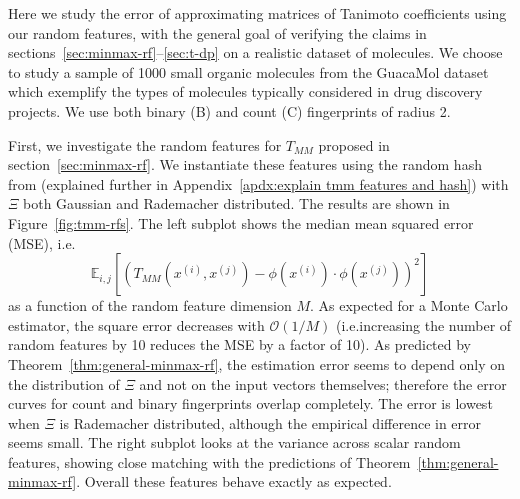 Here we study the error of approximating matrices of Tanimoto coefficients using our random features,
with the general goal of verifying the claims in sections~\ref{sec:minmax-rf}--\ref{sec:t-dp} on a realistic dataset of molecules.
We choose to study a sample of 1000
small organic molecules from the GuacaMol dataset \citep{brown2019guacamol,mendez2019chembl} %
which exemplify the types of molecules typically considered in drug discovery projects.
We use both binary (B) and count (C) fingerprints of radius 2.

First, we investigate the random features for $T_{MM}$ proposed in section~\ref{sec:minmax-rf}.
We instantiate these features using the random hash from \citet{ioffe2010improved} (explained further in Appendix~\ref{apdx:explain tmm features and hash})
with $\Xi$ both Gaussian and Rademacher distributed.
The results are shown in Figure~\ref{fig:tmm-rfs}.
The left subplot shows the median mean squared error (MSE), i.e.
$$\mathbb{E}_{i,j} \left[\left(T_{MM}(x^{(i)}, x^{(j)})-\phi(x^{(i)})\cdot \phi(x^{(j)}) \right)^2\right]$$ as a function of the random feature dimension $M$.
As expected for a Monte Carlo estimator, the square error decreases with $\mathcal O(1/M)$ (i.e.\@ increasing the number of random features by 10 reduces the MSE by a factor of 10).
As predicted by Theorem~\ref{thm:general-minmax-rf},
the estimation error seems to depend only on the distribution of $\Xi$ and not on the input vectors themselves;
therefore the error curves for count and binary fingerprints overlap completely.
The error is lowest when $\Xi$ is Rademacher distributed, although the empirical difference in error seems small.
The right subplot looks at the variance across scalar random features,
showing close matching with the predictions of Theorem~\ref{thm:general-minmax-rf}.
Overall these features behave exactly as expected.

